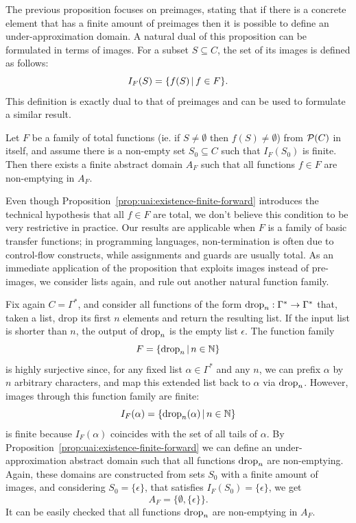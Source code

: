 The previous proposition focuses on preimages, stating that if there is a concrete element that has a finite amount of preimages then it is possible to define an under-approximation domain. A natural dual of this proposition can be formulated in terms of images.
For a subset $S \subseteq C$, the set of its images is defined as follows:
\[
I_F(S) = \{ f(S) \,\vert\, f \in F \} .
\]
This definition is exactly dual to that of preimages and can be used to formulate a similar result.
\begin{prop}\label{prop:uai:existence-finite-forward}
	Let $F$ be a family of total functions (ie. if $S \neq \emptyset$ then $f(S) \neq \emptyset$) from $\mathcal{P}(C)$ in itself, and assume there is a non-empty set $S_0 \subseteq C$ such that $I_F(S_0)$ is finite. Then there exists a finite abstract domain $A_F$ such that all functions $f \in F$ are non-emptying in $A_F$.
\end{prop}
Even though Proposition~\ref{prop:uai:existence-finite-forward} introduces the technical hypothesis that all $f \in F$ are total, we don't believe this condition to be very restrictive in practice. Our results are applicable when $F$ is a family of basic transfer functions; in programming languages, non-termination is often due to control-flow constructs, while assignments and guards are usually total.
As an immediate application of the proposition that exploits images instead of pre-images, we consider lists again, and rule out another natural function family.
\begin{example}\label{ex:uai:construction-ne-domain-forward}
	Fix again $C = \Gamma^{*}$, and consider all functions of the form $\text{drop}_n : \Gamma^* \rightarrow \Gamma^*$ that, taken a list, drop its first $n$ elements and return the resulting list. If the input list is shorter than $n$, the output of $\text{drop}_n$ is the empty list $\epsilon$.
	The function family
	\[
	F = \{ \text{drop}_n \,\vert\, n \in \mathbb{N} \}
	\]
	is highly surjective since, for any fixed list $\alpha \in \Gamma^*$ and any $n$, we can prefix $\alpha$ by $n$ arbitrary characters, and map this extended list back to $\alpha$ via $\text{drop}_n$.
	However, images through this function family are finite:
	\[
	I_F(\alpha) = \{ \text{drop}_n(\alpha) \,\vert\, n \in \mathbb{N} \}
	\]
	is finite because $I_F(\alpha)$ coincides with the set of all tails of $\alpha$. By Proposition~\ref{prop:uai:existence-finite-forward} we can define an under-approximation abstract domain such that all functions $\text{drop}_n$ are non-emptying. Again, these domains are constructed from sets $S_0$ with a finite amount of images, and considering $S_0 = \{ \epsilon \}$, that satisfies $I_F(S_0) = \{ \epsilon \}$, we get
	\[
	A_F = \{ \emptyset, \{ \epsilon \} \} .
	\]
	It can be easily checked that all functions $\text{drop}_n$ are non-emptying in $A_F$.
\end{example}

